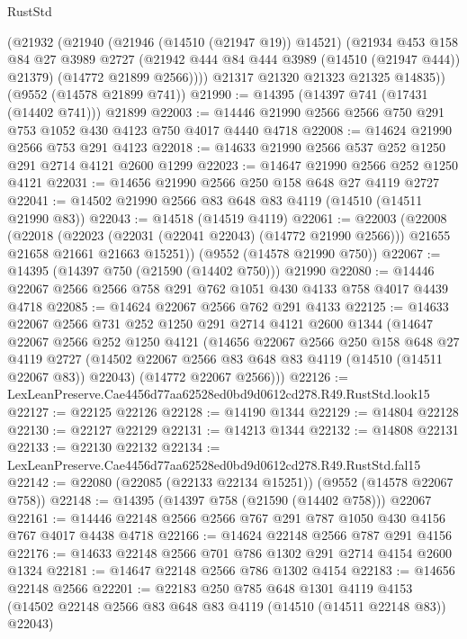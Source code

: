 \begin{lexlean}{RustStd}
\begin{coremodule}
        (@21932
          (@21940
            (@21946 (@14510 (@21947 @19)) @14521)
            (@21934
              @453
              @158
              @84
              @27
              @3989
              @2727
              (@21942 @444 @84 @444 @3989 (@14510 (@21947 @444)) @21379)
              (@14772 @21899 @2566))))
        @21317
        @21320
        @21323
        @21325
        @14835))
    (@9552 (@14578 @21899 @741))
@21990 := @14395 (@14397 @741 (@17431 (@14402 @741))) @21899
@22003 := @14446 @21990 @2566 @2566 @750 @291 @753 @1052 @430 @4123 @750 @4017 @4440 @4718
@22008 := @14624 @21990 @2566 @753 @291 @4123
@22018 := @14633 @21990 @2566 @537 @252 @1250 @291 @2714 @4121 @2600 @1299
@22023 := @14647 @21990 @2566 @252 @1250 @4121
@22031 := @14656 @21990 @2566 @250 @158 @648 @27 @4119 @2727
@22041 := @14502 @21990 @2566 @83 @648 @83 @4119 (@14510 (@14511 @21990 @83))
@22043 := @14518 (@14519 @4119)
@22061 := @22003
    (@22008
      (@22018
        (@22023 (@22031 (@22041 @22043) (@14772 @21990 @2566)))
        @21655
        @21658
        @21661
        @21663
        @15251))
    (@9552 (@14578 @21990 @750))
@22067 := @14395 (@14397 @750 (@21590 (@14402 @750))) @21990
@22080 := @14446 @22067 @2566 @2566 @758 @291 @762 @1051 @430 @4133 @758 @4017 @4439 @4718
@22085 := @14624 @22067 @2566 @762 @291 @4133
@22125 := @14633
    @22067
    @2566
    @731
    @252
    @1250
    @291
    @2714
    @4121
    @2600
    @1344
    (@14647
      @22067
      @2566
      @252
      @1250
      @4121
      (@14656
        @22067
        @2566
        @250
        @158
        @648
        @27
        @4119
        @2727
        (@14502 @22067 @2566 @83 @648 @83 @4119 (@14510 (@14511 @22067 @83)) @22043)
        (@14772 @22067 @2566)))
@22126 := LexLeanPreserve.Cae4456d77aa62528ed0bd9d0612cd278.R49.RustStd.look15
@22127 := @22125 @22126
@22128 := @14190 @1344
@22129 := @14804 @22128
@22130 := @22127 @22129
@22131 := @14213 @1344
@22132 := @14808 @22131
@22133 := @22130 @22132
@22134 := LexLeanPreserve.Cae4456d77aa62528ed0bd9d0612cd278.R49.RustStd.fal15
@22142 := @22080 (@22085 (@22133 @22134 @15251)) (@9552 (@14578 @22067 @758))
@22148 := @14395 (@14397 @758 (@21590 (@14402 @758))) @22067
@22161 := @14446 @22148 @2566 @2566 @767 @291 @787 @1050 @430 @4156 @767 @4017 @4438 @4718
@22166 := @14624 @22148 @2566 @787 @291 @4156
@22176 := @14633 @22148 @2566 @701 @786 @1302 @291 @2714 @4154 @2600 @1324
@22181 := @14647 @22148 @2566 @786 @1302 @4154
@22183 := @14656 @22148 @2566
@22201 := @22183
    @250
    @785
    @648
    @1301
    @4119
    @4153
    (@14502 @22148 @2566 @83 @648 @83 @4119 (@14510 (@14511 @22148 @83)) @22043)

\end{coremodule}
\end{lexlean}
